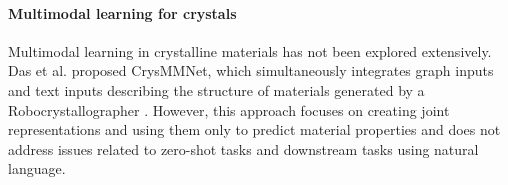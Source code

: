 \paragraph{Multimodal learning for crystals}
Multimodal learning in crystalline materials has not been explored extensively. Das et al. \cite{das2023crysmmnet} proposed CrysMMNet, which simultaneously integrates graph inputs and text inputs describing the structure of materials generated by a Robocrystallographer \cite{ganose2019robocrystallographer}. However, this approach focuses on creating joint representations and using them only to predict material properties and does not address issues related to zero-shot tasks and downstream tasks using natural language.